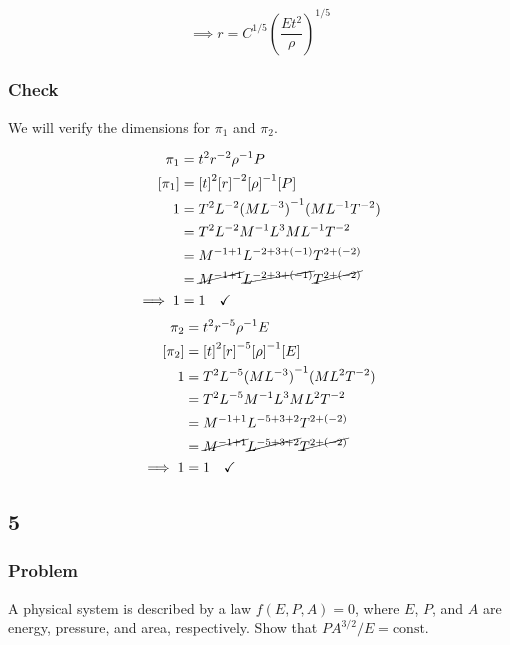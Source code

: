 \documentclass[12pt]{article}
\begin{document}
  \begin{equation*}
    \boxed{\implies r = C^{1/5}{\left(\frac{Et^2}{\rho}\right)}^{1/5}}
  \end{equation*}

  \subsubsection*{Check}
  We will verify the dimensions for $\pi_1$ and $\pi_2$.

  \begin{equation*}
    \begin{aligned}
      \pi_1 &= t^2r^{-2}\rho^{-1}P \\
      [\pi_1] &= {[t]}^2{[r]}^{-2}{[\rho]}^{-1}[P] \\
      1 &= T^2L^{-2}{(ML^{-3})}^{-1}(ML^{-1}T^{-2}) \\
      &= T^2L^{-2}M^{-1}L^{3}ML^{-1}T^{-2} \\
      &= M^{-1+1}L^{-2+3+(-1)}T^{2+(-2)} \\
      &= \cancel{M^{-1+1}}\cancel{L^{-2+3+(-1)}}\cancel{T^{2+(-2)}} \\
      \implies 1 &= 1 \quad\checkmark \\
    \end{aligned}
  \end{equation*}
  \begin{equation*}
    \begin{aligned}
      \pi_2 &= t^{2} r^{-5} \rho^{-1} E  \\
      [\pi_2] &= {[t]}^{2} {[r]}^{-5} {[\rho]}^{-1} [E] \\
      1 &= T^2 L^{-5} {(ML^{-3})}^{-1} (ML^2T^{-2}) \\
      &= T^2 L^{-5} M^{-1}L^{3} ML^2T^{-2} \\
      &= M^{-1+1} L^{-5+3+2} T^{2+(-2)} \\
      &= \cancel{M^{-1+1}} \cancel{L^{-5+3+2}} \cancel{T^{2+(-2)}} \\
      \implies 1 &= 1 \quad\checkmark \\
    \end{aligned}
  \end{equation*}

\subsection{5}
  \subsubsection*{Problem}
  A physical system is described by a law $f(E,P,A)=0$, where $E$, $P$, and $A$
  are energy, pressure, and area, respectively. Show that $PA^{3/2}/E=\text{const}$.
\end{document}
